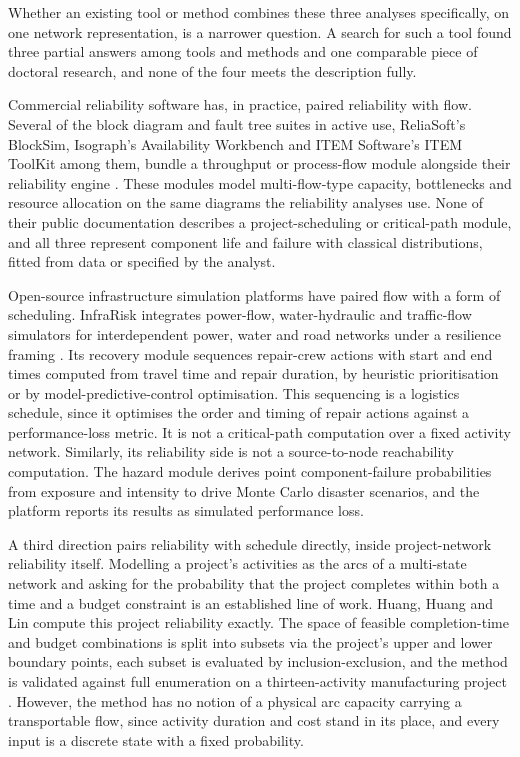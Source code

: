 \documentclass[12pt]{report}
\begin{document}
Whether an existing tool or method combines these three analyses specifically, on one network
representation, is a narrower question. A search for such a tool found three partial answers
among tools and methods and one comparable piece of doctoral research, and none of the four
meets the description fully.

Commercial reliability software has, in practice, paired reliability with flow. Several of the
block diagram and fault tree suites in active use, ReliaSoft's BlockSim, Isograph's
Availability Workbench and ITEM Software's ITEM ToolKit among them, bundle a throughput or
process-flow module alongside their reliability engine
\cite{reliasoft2024blocksim,isograph2024availability,itemsoftware2024toolkit}. These modules
model multi-flow-type capacity, bottlenecks and resource allocation on the same diagrams the
reliability analyses use. None of their
public documentation describes a project-scheduling or critical-path module, and all three
represent component life and failure with classical distributions, fitted from data or
specified by the analyst.

Open-source infrastructure simulation platforms have paired flow with a form of
scheduling. InfraRisk integrates power-flow, water-hydraulic and traffic-flow simulators for
interdependent power, water and road networks under a resilience framing
\cite{balakrishnan2022infrarisk}. Its recovery module sequences repair-crew actions with start
and end times computed from travel time and repair duration, by heuristic prioritisation or by
model-predictive-control optimisation. This sequencing is a logistics schedule, since it
optimises the order and timing of repair actions against a performance-loss metric. It is not a
critical-path computation over a fixed activity network. Similarly, its reliability side is not
a source-to-node reachability computation. The hazard module derives point component-failure
probabilities from exposure and intensity to drive Monte Carlo disaster scenarios, and the
platform reports its results as simulated performance loss.

A third direction pairs reliability with schedule directly, inside project-network reliability
itself. Modelling a project's activities as the arcs of a multi-state network and asking for the
probability that the project completes within both a time and a budget constraint is an
established line of work. Huang, Huang and Lin compute this project reliability exactly. The space of feasible
completion-time and budget combinations is split into subsets via the project's upper and lower
boundary points, each subset is evaluated by inclusion-exclusion, and the method is validated
against full enumeration on a thirteen-activity manufacturing project \cite{huang2020exact}.
However, the method has no notion of a physical arc capacity carrying a transportable flow,
since activity duration and cost stand in its place, and every input is a discrete state with a
fixed probability.
\end{document}
